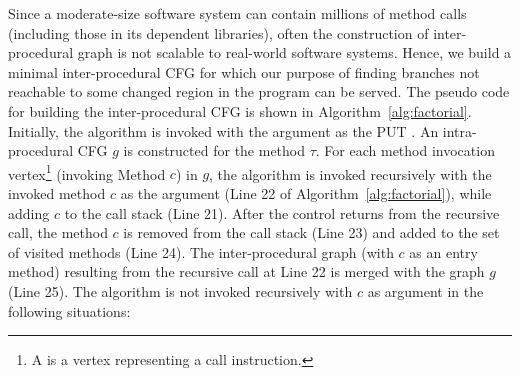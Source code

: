 Since a moderate-size software system can contain millions of method calls (including those in its dependent libraries), often the construction of inter-procedural graph is not scalable to real-world software systems. Hence, we build a minimal inter-procedural CFG for which our purpose of finding branches not reachable to some changed region in the program can be served. The pseudo code for building the inter-procedural CFG is shown in Algorithm~\ref{alg:factorial}. Initially, the algorithm  is invoked with the argument as the PUT \CodeIn{$\tau$}. An intra-procedural CFG $g$ is constructed for the method $\tau$. 
For each method invocation vertex\footnote{A  is a vertex representing a call instruction.} (invoking Method $c$) in $g$, the algorithm  is invoked recursively with the invoked method $c$ as the argument (Line 22 of Algorithm~\ref{alg:factorial}), while adding $c$ to the call stack (Line 21). After the control returns from the recursive call, the method $c$ is removed from the call stack (Line 23) and added to the set of visited methods (Line 24). The inter-procedural graph  (with $c$ as an entry method) resulting from the recursive call at Line 22 is merged with the graph $g$ (Line 25).
The algorithm  is not invoked recursively with $c$ as argument in the following situations:

